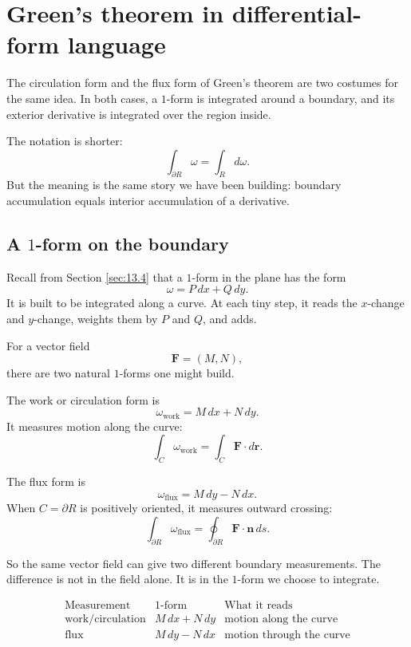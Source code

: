 \section{Green's theorem in differential-form language}
\label{sec:14.4}

The circulation form and the flux form of Green's theorem are two costumes for the
same idea.  In both cases, a \(1\)-form is integrated around a boundary, and its exterior
derivative is integrated over the region inside.

The notation is shorter:
\[
    \int_{\partial R}\omega=\int_R d\omega.
\]
But the meaning is the same story we have been building: boundary accumulation equals
interior accumulation of a derivative.

\subsection{A \(1\)-form on the boundary}

Recall from Section \ref{sec:13.4} that a \(1\)-form in the plane has the form
\[
    \omega=P\,dx+Q\,dy.
\]
It is built to be integrated along a curve.  At each tiny step, it reads the \(x\)-change
and \(y\)-change, weights them by \(P\) and \(Q\), and adds.

For a vector field
\[
    \mathbf F=(M,N),
\]
there are two natural \(1\)-forms one might build.

The work or circulation form is
\[
\boxed{
    \omega_{\mathrm{work}}=M\,dx+N\,dy.
}
\]
It measures motion along the curve:
\[
    \int_C \omega_{\mathrm{work}}
    =
    \int_C \mathbf F\cdot d\mathbf r.
\]

The flux form is
\[
\boxed{
    \omega_{\mathrm{flux}}=M\,dy-N\,dx.
}
\]
When \(C=\partial R\) is positively oriented, it measures outward crossing:
\[
    \int_{\partial R}\omega_{\mathrm{flux}}
    =
    \oint_{\partial R}\mathbf F\cdot\mathbf n\,ds.
\]

So the same vector field can give two different boundary measurements.  The difference
is not in the field alone.  It is in the \(1\)-form we choose to integrate.

\[
\begin{array}{c|c|c}
\text{Measurement} & \text{\(1\)-form} & \text{What it reads}\\ \hline
\text{work/circulation} & M\,dx+N\,dy & \text{motion along the curve}\\[1mm]
\text{flux} & M\,dy-N\,dx & \text{motion through the curve}
\end{array}
\]

